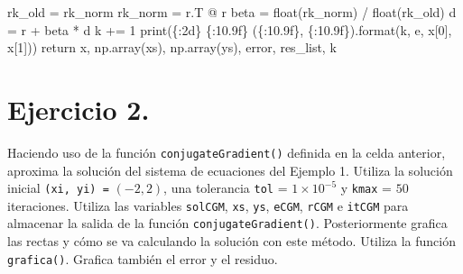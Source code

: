 \documentclass[
  letterpaper,
  DIV=11,
  numbers=noendperiod]{scrreprt}
\newenvironment{Shaded}{\begin{snugshade}}{\end{snugshade}}
\newcommand{\BuiltInTok}[1]{\textcolor[rgb]{0.00,0.23,0.31}{#1}}
\newcommand{\ControlFlowTok}[1]{\textcolor[rgb]{0.00,0.23,0.31}{#1}}
\newcommand{\DecValTok}[1]{\textcolor[rgb]{0.68,0.00,0.00}{#1}}
\newcommand{\NormalTok}[1]{\textcolor[rgb]{0.00,0.23,0.31}{#1}}
\newcommand{\OperatorTok}[1]{\textcolor[rgb]{0.37,0.37,0.37}{#1}}
\newcommand{\SpecialCharTok}[1]{\textcolor[rgb]{0.37,0.37,0.37}{#1}}
\newcommand{\StringTok}[1]{\textcolor[rgb]{0.13,0.47,0.30}{#1}}
\begin{document}
\begin{Shaded}
\begin{Highlighting}[]
\NormalTok{        rk\_old }\OperatorTok{=}\NormalTok{ rk\_norm}
\NormalTok{        rk\_norm }\OperatorTok{=}\NormalTok{ r.T }\OperatorTok{@}\NormalTok{ r}
\NormalTok{        beta }\OperatorTok{=} \BuiltInTok{float}\NormalTok{(rk\_norm) }\OperatorTok{/} \BuiltInTok{float}\NormalTok{(rk\_old)}
\NormalTok{        d }\OperatorTok{=}\NormalTok{ r }\OperatorTok{+}\NormalTok{ beta }\OperatorTok{*}\NormalTok{ d}
\NormalTok{        k }\OperatorTok{+=} \DecValTok{1}
        \BuiltInTok{print}\NormalTok{(}\StringTok{\textquotesingle{}}\SpecialCharTok{\{:2d\}}\StringTok{ }\SpecialCharTok{\{:10.9f\}}\StringTok{ (}\SpecialCharTok{\{:10.9f\}}\StringTok{, }\SpecialCharTok{\{:10.9f\}}\StringTok{)\textquotesingle{}}\NormalTok{.}\BuiltInTok{format}\NormalTok{(k, e, x[}\DecValTok{0}\NormalTok{], x[}\DecValTok{1}\NormalTok{]))}
    \ControlFlowTok{return}\NormalTok{ x, np.array(xs), np.array(ys), error, res\_list, k}
\end{Highlighting}
\end{Shaded}

\section{\texorpdfstring{\textbf{Ejercicio
2.}}{Ejercicio 2.}}\label{ejercicio-2.-5}

Haciendo uso de la función \texttt{conjugateGradient()} definida en la
celda anterior, aproxima la solución del sistema de ecuaciones del
Ejemplo 1. Utiliza la solución inicial \texttt{(xi,\ yi)\ =}
\((-2, 2)\), una tolerancia \texttt{tol} = \(1 \times 10^{-5}\) y
\texttt{kmax} = \(50\) iteraciones. Utiliza las variables
\texttt{solCGM}, \texttt{xs}, \texttt{ys}, \texttt{eCGM}, \texttt{rCGM}
e \texttt{itCGM} para almacenar la salida de la función
\texttt{conjugateGradient()}. Posteriormente grafica las rectas y cómo
se va calculando la solución con este método. Utiliza la función
\texttt{grafica()}. Grafica también el error y el residuo.
\end{document}
